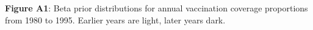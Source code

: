 \textbf{Figure A1}: Beta prior distributions for annual vaccination coverage proportions from 1980 to 1995. Earlier years are light, later years dark.
